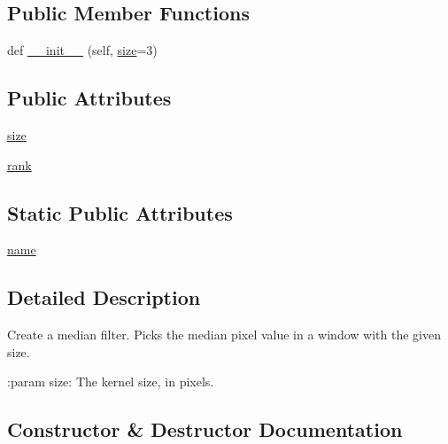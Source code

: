 \subsection*{Public Member Functions}
\begin{DoxyCompactItemize}
\item 
def \hyperlink{classPIL_1_1ImageFilter_1_1MedianFilter_ae97f16ff6c4894032dca263dbdf6e4bf}{\+\_\+\+\_\+init\+\_\+\+\_\+} (self, \hyperlink{classPIL_1_1ImageFilter_1_1MedianFilter_a9517a0020b776fca99004889a21f7511}{size}=3)
\end{DoxyCompactItemize}
\subsection*{Public Attributes}
\begin{DoxyCompactItemize}
\item 
\hyperlink{classPIL_1_1ImageFilter_1_1MedianFilter_a9517a0020b776fca99004889a21f7511}{size}
\item 
\hyperlink{classPIL_1_1ImageFilter_1_1MedianFilter_a248129997ce9dc5beac3a49621f42da5}{rank}
\end{DoxyCompactItemize}
\subsection*{Static Public Attributes}
\begin{DoxyCompactItemize}
\item 
\hyperlink{classPIL_1_1ImageFilter_1_1MedianFilter_af1e930953d399653dcc9590a0247e7ed}{name}
\end{DoxyCompactItemize}


\subsection{Detailed Description}
\begin{DoxyVerb}Create a median filter. Picks the median pixel value in a window with the
given size.

:param size: The kernel size, in pixels.
\end{DoxyVerb}
 

\subsection{Constructor \& Destructor Documentation}
\mbox{\label{classPIL_1_1ImageFilter_1_1MedianFilter_ae97f16ff6c4894032dca263dbdf6e4bf}} 
